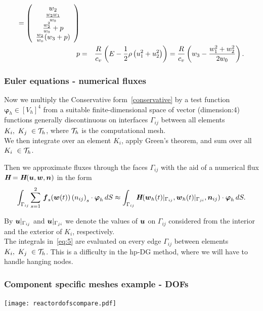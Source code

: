 \documentclass{beamer}
\begin{document}
\begin{frame}
\begin{eqnarray}
			 = \left(\begin{array}{c} w_2\\ \frac{w_2w_1}{w_0}\\ \frac{w_2^2}{w_0} + p\\ \frac{w_2}{w_0}(w_3+p) \end{array} \right)\\
p         & = & {R\over c_v} \left(E-\frac{1}{2} \rho\left(u_1^2 + u_2^2\right)\right)= {R\over c_v} \left(w_3-{w_1^2+w_2^2\over{2} w_0}\right).
\end{eqnarray}
\normalsize
\end{frame}

\begin{frame}
\frametitle{Euler equations - numerical fluxes}
Now we multiply the Conservative form~\ref{conservative} by a test function $\boldsymbol{\varphi}_h\in \left[V_h\right]^4$ from a suitable finite-dimensional space of vector (dimension:4) functions generally discontinuous on interfaces $\Gamma_{ij}$ between all elements $K_i,\ K_j\ \in \mathcal{T}_h$, where $\mathcal{T}_h$ is the computational mesh.\\
We then integrate over an element $K_i$, apply Green's theorem, and sum over all $K_i\ \in \mc{T}_h$.

Then we approximate fluxes through the faces $\Gamma_{ij}$ with the aid of a numerical flux $\textit{\textbf{H}}=\textit{\textbf{H}}(\mbox{\boldmath $u$},\mbox{\boldmath $w$},\mbox{\boldmath $n$})$ in the form
\begin{equation} \label{eq:5}
\int_{\Gamma_{ij}}  \sum_{s=1}^2\,\mbox{\boldmath $f$}_s(\mbox{\boldmath $w$}(t))\,{(n_{ij})}_s\cdot \boldsymbol{\varphi}_h \,d S
 \approx
\int_{\Gamma_{ij}} 
\textit{\textbf{H}}(\mbox{\boldmath $w$}_h(t)|_{\Gamma_{ij}}, \mbox{\boldmath $w$}_h(t)|_{\Gamma_{ji}},\mbox{\boldmath $n$}_{ij})\cdot\boldsymbol{\varphi}_h\,d S.
\end{equation}

By $\mbox{\boldmath $u$}|_{\Gamma_{ij}}$ and 
$\mbox{\boldmath $u$}|_{\Gamma_{ji}}$ we denote the values of $\mbox{\boldmath $u$}$ on $\Gamma_{ij}$
considered from the interior and the exterior 
of $K_i$, respectively.\\
The integrals in~\ref{eq:5} are evaluated on every edge $\Gamma_{ij}$ between elements $K_i,\ K_j\ \in \mathcal{T}_h$.
This is a difficulty in the hp-DG method, where we will have to handle hanging nodes.
\end{frame}


\begin{frame}
\frametitle{Component specific meshes example - DOFs}
\begin{center}
\texttt{[image: reactordofscompare.pdf]}
\end{center}
\end{frame}
\end{document}
